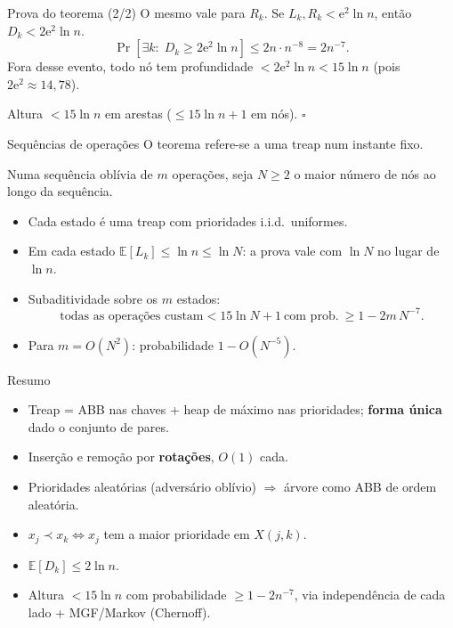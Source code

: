 \documentclass[aspectratio=169,11pt]{beamer}
\newcommand{\E}[1]{\mathbb{E}\!\left[#1\right]}
\newcommand{\ProbE}[1]{\Pr\!\left[#1\right]}
\theoremstyle{definition}
\begin{document}
\begin{frame}{Prova do teorema (2/2)}
  O mesmo vale para $R_k$. Se $L_k,R_k<\mathrm e^2\ln n$, então
  $D_k<2\mathrm e^2\ln n$.
  \pause
  \[
    \ProbE{\exists k:\;D_k\ge2\mathrm e^2\ln n}
    \le 2n\cdot n^{-8}=2n^{-7}.
  \]
  \pause
  Fora desse evento, todo nó tem profundidade
  $<2\mathrm e^2\ln n<15\ln n$ (pois $2\mathrm e^2\approx14{,}78$).

  Altura $<15\ln n$ em arestas ($\le15\ln n+1$ em nós). \hfill $\square$
\end{frame}

\begin{frame}{Sequências de operações}
  O teorema refere-se a uma treap num instante fixo.

  \medskip
  Numa sequência oblívia de $m$ operações, seja $N\ge2$ o maior número
  de nós ao longo da sequência.
  \begin{itemize}
  \item Cada estado é uma treap com prioridades i.i.d.\ uniformes.
  \item Em cada estado $\E{L_k}\le\ln n\le\ln N$: a prova vale com
    $\ln N$ no lugar de $\ln n$.
  \item Subaditividade sobre os $m$ estados:
    \[
      \text{todas as operações custam}<15\ln N+1
      \ \text{com prob.}\ \ge1-2m\,N^{-7}.
    \]
  \item Para $m=O(N^2)$: probabilidade $1-O(N^{-5})$.
  \end{itemize}
\end{frame}

\begin{frame}{Resumo}
  \begin{itemize}
  \item Treap = ABB nas chaves + heap de máximo nas prioridades;
    \textbf{forma única} dado o conjunto de pares.
  \item Inserção e remoção por \textbf{rotações}, $O(1)$ cada.
  \item Prioridades aleatórias (adversário oblívio) $\Rightarrow$
    árvore como ABB de ordem aleatória.
  \item $x_j\prec x_k\iff x_j$ tem a maior prioridade em $X(j,k)$.
  \item $\E{D_k}\le2\ln n$.
  \item Altura $<15\ln n$ com probabilidade $\ge1-2n^{-7}$, via
    independência de cada lado + MGF/Markov (Chernoff).
  \end{itemize}
\end{frame}
\end{document}
